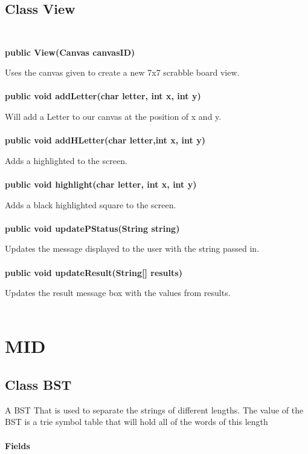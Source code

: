 \documentclass[11pt]{article}
\begin{document}
\subsection{Class View \\\\}
\textbf{public View(Canvas  canvasID)\\}

Uses the canvas given to create a new 7x7 scrabble board view.\\\\
%
\textbf{public void addLetter(char letter, int x, int y)\\}

Will add a Letter to our canvas at the position of x and y.\\\\
%
\textbf{public void addHLetter(char letter,int x, int y)\\}

Adds a highlighted to the screen.\\\\
%
\textbf{public void highlight(char letter, int x, int y)\\}

Adds a black highlighted square to the screen.\\\\
%
\textbf{public void updatePStatus(String string)\\}

Updates the message displayed to the user with the string passed in.\\\\
%
\textbf{public void updateResult(String[] results)\\}

Updates the result message box with the values from results.\\\\
\newpage
\section{MID\\}
\subsection{Class BST \\}

A BST That is used to separate the strings of different lengths. The value of the BST is a trie symbol table that will hold all of the words of this length\\\\
\textbf{Fields\\}
\end{document}
